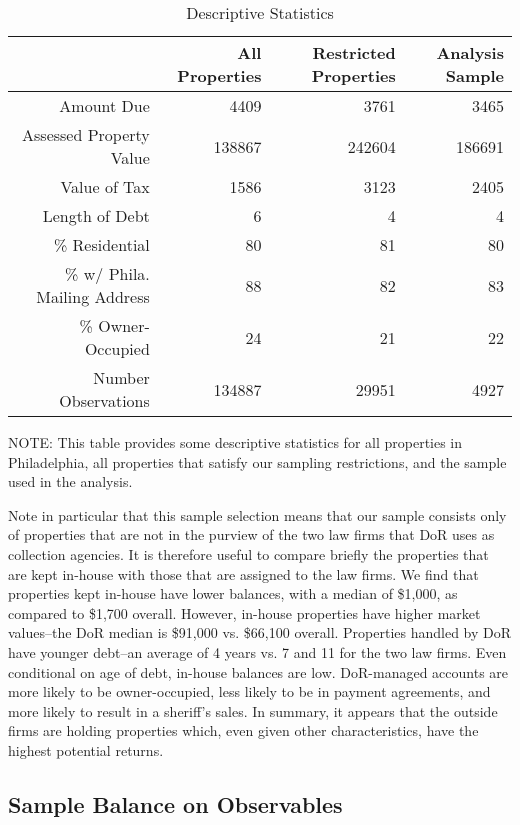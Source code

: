 \documentclass[12pt,titlepage]{article}
\begin{document}
\begin{table}[htb]
\begin{center}
\caption{Descriptive Statistics}\label{table:ds}
\begin{tabular}{|r|r|r|r|}
  \hline
 & All Properties & Restricted Properties & Analysis Sample \\ 
  \hline
Amount Due & 4409 & 3761 & 3465 \\ 
  Assessed Property Value & 138867 & 242604 & 186691 \\ 
  Value of Tax & 1586 & 3123 & 2405 \\ 
  Length of Debt & 6 & 4 & 4 \\ 
  \% Residential & 80 & 81 & 80 \\ 
  \% w/ Phila. Mailing Address & 88 & 82 & 83 \\ 
  \% Owner-Occupied & 24 & 21 & 22 \\ 
  Number Observations & 134887 & 29951 & 4927 \\ 
   \hline
\end{tabular}
\end{center}
NOTE: This table provides some descriptive statistics for all
properties in Philadelphia, all properties that satisfy our sampling
restrictions, and the sample used in the analysis.
\end{table}

Note in particular that this sample selection means that our sample
consists only of properties that are not in the purview of the two law
firms that DoR uses as collection agencies. It is therefore useful to
compare briefly the properties that are kept in-house with those that
are assigned to the law firms. We find that properties kept in-house
have lower balances, with a median of \$1,000, as compared to \$1,700
overall. However, in-house properties have higher market values--the
DoR median is \$91,000 vs. \$66,100 overall. Properties handled by DoR
have younger debt--an average of 4 years vs. 7 and 11 for the two law
firms.  Even conditional on age of debt, in-house balances are low.
DoR-managed accounts are more likely to be owner-occupied, less likely
to be in payment agreements, and more likely to result in a sheriff's
sales. In summary, it appears that the outside firms are holding
properties which, even given other characteristics, have the highest
potential returns.

\subsection{Sample Balance on Observables}
\end{document}
